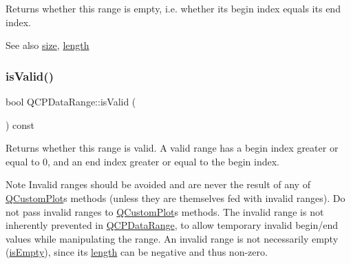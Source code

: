 Returns whether this range is empty, i.\+e. whether its begin index equals its end index.

\begin{DoxySeeAlso}{See also}
\mbox{\hyperlink{class_q_c_p_data_range_ac6af055e509d1b691c244954ff1c5887}{size}}, \mbox{\hyperlink{class_q_c_p_data_range_a1e7836058f755c6ab9f11996477b7150}{length}} 
\end{DoxySeeAlso}
\mbox{\label{class_q_c_p_data_range_aae53a37472212dca0a7939963e20dba0}} 
\subsubsection{\texorpdfstring{is\+Valid()}{isValid()}}
{\footnotesize\ttfamily bool Q\+C\+P\+Data\+Range\+::is\+Valid (\begin{DoxyParamCaption}{ }\end{DoxyParamCaption}) const\hspace{0.3cm}{\ttfamily [inline]}}

Returns whether this range is valid. A valid range has a begin index greater or equal to 0, and an end index greater or equal to the begin index.

\begin{DoxyNote}{Note}
Invalid ranges should be avoided and are never the result of any of \mbox{\hyperlink{class_q_custom_plot}{Q\+Custom\+Plot}}\textquotesingle{}s methods (unless they are themselves fed with invalid ranges). Do not pass invalid ranges to \mbox{\hyperlink{class_q_custom_plot}{Q\+Custom\+Plot}}\textquotesingle{}s methods. The invalid range is not inherently prevented in \mbox{\hyperlink{class_q_c_p_data_range}{Q\+C\+P\+Data\+Range}}, to allow temporary invalid begin/end values while manipulating the range. An invalid range is not necessarily empty (\mbox{\hyperlink{class_q_c_p_data_range_ac32e53fc05d6cd2eac96b96a7265d3b8}{is\+Empty}}), since its \mbox{\hyperlink{class_q_c_p_data_range_a1e7836058f755c6ab9f11996477b7150}{length}} can be negative and thus non-\/zero. 
\end{DoxyNote}
\mbox{\label{class_q_c_p_data_range_a1e7836058f755c6ab9f11996477b7150}} 
